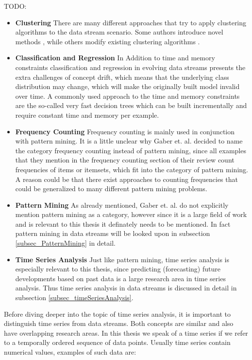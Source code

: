TODO:


\begin{itemize}
	\item \textbf{Clustering} There are many different approaches that try to apply clustering algorithms to the data stream scenario. Some authors introduce novel methods \cite{aggarwal2003framework} \cite{aggarwal2004framework}, while others modify existing clustering algorithms \cite{guha2000clustering}.
	\item \textbf{Classification and Regression} In Addition to time and memory constraints classification and regression in evolving data streams presents the extra challenges of concept drift, which means that the underlying class distribution may change, which will make the originally built model invalid over time. A commonly used approach to the time and memory constraints are the so-called very fast decision trees \cite{domingos2000mining} which can be built incrementally and require constant time and memory per example.
	\item \textbf{Frequency Counting} Frequency counting is mainly used in conjunction with pattern mining. It is a little unclear why Gaber et. al. decided to name the category frequency counting instead of pattern mining, since all examples that they mention in the frequency counting section of their review count frequencies of items or itemsets, which fit into the category of pattern mining. A reason could be that there exist approaches to counting frequencies that could be generalized to many different pattern mining problems.
	\item \textbf{Pattern Mining} As already mentioned, Gaber et. al. do not explicitly mention pattern mining as a category, however since it is a large field of work and is relevant to this thesis it definately needs to be mentioned. In fact pattern mining in data streams will be looked upon in subsection \ref{subsec_PatternMining} in detail. 
	\item \textbf{Time Series Analysis} Just like pattern mining, time series analysis is especially relevant to this thesis, since predicting (forecasting) future developments based on past data is a large research area in time series analysis. Thus time series analysis in data streams is discussed in detail in subsection \ref{subsec_timeSeriesAnalysis}.
\end{itemize}




Before diving deeper into the topic of time series analysis, it is important to distinguish time series from data streams. Both concepts are similar and also have overlapping research areas. In this thesis we speak of a time series if we refer to a temporally ordered sequence of data points. Usually time series contain numerical values, examples of such data are:

